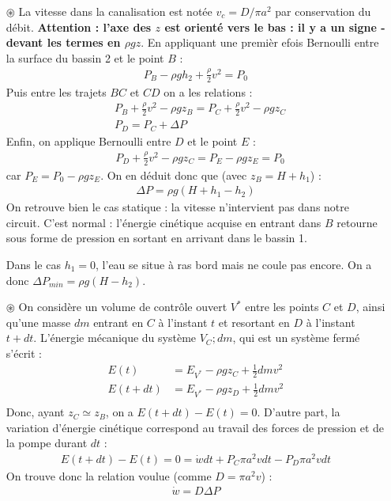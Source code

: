 \documentclass{report}
\begin{document}
\begin{itemize}
	\item[$\circledast$] La vitesse dans la canalisation est notée $v_c=D/\pi a^2$ par conservation du débit. \textbf{Attention : l'axe des $z$ est orienté vers le bas : il y a un signe - devant les termes en $\rho gz$}. En appliquant une premièr efois Bernoulli entre la surface du bassin 2 et le point $B$ :
	\begin{align*}
		 P_B-\rho g h_2 +\frac{\rho}{2}v^2 = P_0 
	\end{align*}
	Puis entre les trajets $BC$ et $CD$ on a les relations :
		\begin{align*}
		& P_B+\frac{\rho}{2}v^2-\rho g z_B = P_C+\frac{\rho}{2}v^2-\rho g z_C \\
		& P_D= P_C+\Delta P 
	\end{align*}
	Enfin, on applique Bernoulli entre $D$ et le point $E$ :
		\begin{align*}
		& P_D+\frac{\rho}{2}v^2-\rho g z_C= P_E-\rho g z_E = P_0
	\end{align*}	
	car $P_E=P_0-\rho g z_E$. On en déduit donc que (avec $z_B=H+h_1$) :
	\begin{align*}
		\Delta P = \rho g(H+h_1-h_2)
	\end{align*}
	On retrouve bien le cas statique : la vitesse n'intervient pas dans notre circuit. C'est normal : l'énergie cinétique acquise en entrant dans $B$ retourne sous forme de pression en sortant en arrivant dans le bassin 1.
	
	Dans le cas $h_1=0$, l'eau se situe à ras bord mais ne coule pas encore. On a donc $\Delta P_{min}=\rho g(H-h_2)$.
	
	\item[$\circledast$] On considère un volume de contrôle ouvert $V^\ast$ entre les points $C$ et $D$, ainsi qu'une masse $dm$ entrant en $C$ à l'instant $t$ et resortant en $D$ à l'instant $t+dt$. L'énergie mécanique du système ${V_C; dm}$, qui est un système fermé s'écrit :
	\begin{align*}
		E(t)&=E_{V^\ast}-\rho g z_C + \frac{1}{2}dm v^2 \\
		E(t+dt)&=E_{V^\ast}-\rho g z_D + \frac{1}{2}dm v^2 \\
	\end{align*}
	Donc, ayant $z_C\simeq z_B$, on a $E(t+dt)-E(t)=0$. D'autre part, la variation d'énergie cinétique correspond au travail des forces de pression et de la pompe durant $dt$ :
	\begin{align*}
	E(t+dt)-E(t)=0=\dot{w}dt+P_C \pi a^2 v dt -P_D\pi a^2 v dt
	\end{align*}
	On trouve donc la relation voulue (comme $D=\pi a^2 v$) :
	\begin{align*}
		\dot{w} = D\Delta P 
	\end{align*}
	

\end{itemize}
\end{document}
